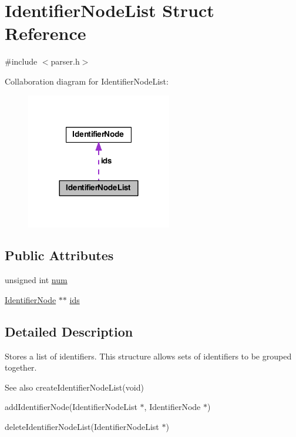 \hypertarget{struct_identifier_node_list}{\section{Identifier\-Node\-List Struct Reference}
\label{struct_identifier_node_list}
}


{\ttfamily \#include $<$parser.\-h$>$}



Collaboration diagram for Identifier\-Node\-List\-:
\nopagebreak
\begin{figure}[H]
\begin{center}
\leavevmode
\includegraphics[width=180pt]{struct_identifier_node_list__coll__graph}
\end{center}
\end{figure}
\subsection*{Public Attributes}
\begin{DoxyCompactItemize}
\item 
unsigned int \hyperlink{struct_identifier_node_list_a7ee19db1c4e05eafe5df277542e01dd1}{num}
\item 
\hyperlink{struct_identifier_node}{Identifier\-Node} $\ast$$\ast$ \hyperlink{struct_identifier_node_list_a61b371619c07f89846ae0780d5403dc0}{ids}
\end{DoxyCompactItemize}


\subsection{Detailed Description}
Stores a list of identifiers. This structure allows sets of identifiers to be grouped together.

\begin{DoxySeeAlso}{See also}
create\-Identifier\-Node\-List(void) 

add\-Identifier\-Node(\-Identifier\-Node\-List $\ast$, Identifier\-Node $\ast$) 

delete\-Identifier\-Node\-List(\-Identifier\-Node\-List $\ast$) 
\end{DoxySeeAlso}



